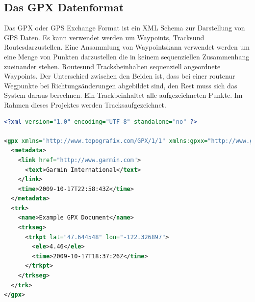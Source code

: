 \subsection{Das GPX Datenformat}
Das GPX oder GPS Exchange Format ist ein XML Schema zur Darstellung von GPS Daten. Es kann verwendet werden um \flqq Waypoints\frqq, \flqq Tracks\frqq und \flqq Routes\frqq darzustellen. Eine Ansammlung von \flqq Waypoints\frqq kann verwendet werden um eine Menge von Punkten darzustellen die in keinem sequenziellen Zusammenhang zueinander stehen. \flqq Routes\frqq und \flqq Tracks\frqq beinhalten sequenziell angeordnete \flqq Waypoints\frqq. Der Unterschied zwischen den Beiden ist, dass bei einer \flqq route\frqq nur Wegpunkte bei Richtungsänderungen abgebildet sind, den Rest muss sich das System daraus berechnen. Ein \flqq Track\frqq beinhaltet alle aufgezeichneten Punkte. Im Rahmen dieses Projektes werden \flqq Tracks\frqq aufgezeichnet. \cite{gpxwiki} \cite{gpx}

\begin{lstlisting}[language=XML, caption={GPX Beispielfile}]
<?xml version="1.0" encoding="UTF-8" standalone="no" ?>

<gpx xmlns="http://www.topografix.com/GPX/1/1" xmlns:gpxx="http://www.garmin.com/xmlschemas/GpxExtensions/v3" xmlns:gpxtpx="http://www.garmin.com/xmlschemas/TrackPointExtension/v1" creator="Oregon 400t" version="1.1" xmlns:xsi="http://www.w3.org/2001/XMLSchema-instance" xsi:schemaLocation="http://www.topografix.com/GPX/1/1 http://www.topografix.com/GPX/1/1/gpx.xsd http://www.garmin.com/xmlschemas/GpxExtensions/v3 http://www.garmin.com/xmlschemas/GpxExtensionsv3.xsd http://www.garmin.com/xmlschemas/TrackPointExtension/v1 http://www.garmin.com/xmlschemas/TrackPointExtensionv1.xsd">
  <metadata>
    <link href="http://www.garmin.com">
      <text>Garmin International</text>
    </link>
    <time>2009-10-17T22:58:43Z</time>
  </metadata>
  <trk>
    <name>Example GPX Document</name>
    <trkseg>
      <trkpt lat="47.644548" lon="-122.326897">
        <ele>4.46</ele>
        <time>2009-10-17T18:37:26Z</time>
      </trkpt>
    </trkseg>
  </trk>
</gpx>
\end{lstlisting}